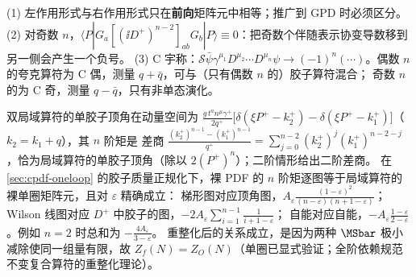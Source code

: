 \begin{remark}
(1) 左作用形式与右作用形式只在\textbf{前向}矩阵元中相等；推广到 GPD 时必须区分。
(2) 对奇数 $n$，$\langle P|G_a[(\ii D^+)^{n-2}]_{ab}G_b|P\rangle\equiv0$：把奇数个伴随表示协变导数移到另一侧会产生一个负号。
(3) C 宇称：$\mathcal S\bar\psi\gamma^{\mu_1}D^{\mu_2}\cdots D^{\mu_n}\psi\to(-1)^n(\cdots)$。偶数 $n$ 的夸克算符为 C 偶，测量 $q+\bar q$，可与（只有偶数 $n$ 的）胶子算符混合；
奇数 $n$ 的为 C 奇，测量 $q-\bar q$，只有非单态演化。
\end{remark}

\begin{remark}[顶角层次与单圈检验]
双局域算符的单胶子顶角在动量空间为 $\frac{g\,t^an^\mu\gamma^+}{2q^+}\big[\delta(\xi P^+-k_2^+)-\delta(\xi P^+-k_1^+)\big]$（$k_2=k_1+q$），其 $n$ 阶矩是
差商 $\frac{(k_2^+)^{n-1}-(k_1^+)^{n-1}}{q^+}=\sum_{j=0}^{n-2}(k_2^+)^j(k_1^+)^{n-2-j}$，恰为局域算符的单胶子顶角（除以 $2(P^+)^n$）；二阶情形给出二阶差商。
在 \cref{sec:cpdf-oneloop} 的胶子质量正规化下，裸 PDF 的 $n$ 阶矩逐图等于局域算符的裸单圈矩阵元，且对 $\varepsilon$ 精确成立：
梯形图对应顶角图，$A_\varepsilon\frac{(1-\varepsilon)^2}{(n-\varepsilon)(n+1-\varepsilon)}$；Wilson 线图对应 $D^+$ 中胶子的图，$-2A_\varepsilon\sum_{i=1}^{n-1}\frac{1}{i+1-\varepsilon}$；
自能对应自能，$-A_\varepsilon\frac{1-\varepsilon}{2-\varepsilon}$。例如 $n=2$ 时总和为 $-\frac{4A_\varepsilon}{3-\varepsilon}$。
重整化后的关系成立，是因为两种 $\MSbar$ 极小减除使同一组量有限，故 $Z_f(N)=Z_O(N)$（单圈已显式验证；全阶依赖规范不变复合算符的重整化理论）。
\end{remark}
